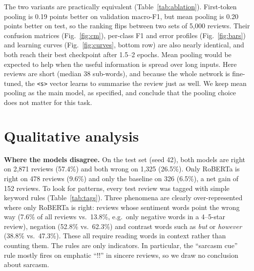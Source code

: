 \documentclass[11pt,a4paper]{article}
\begin{document}
The two variants are practically equivalent (Table~\ref{tab:ablation}). First-token pooling is 0.19 points better on validation macro-F1, but mean pooling is 0.20 points better on test, so the ranking flips between two sets of 5{,}000 reviews. Their confusion matrices (Fig.~\ref{fig:cm}), per-class F1 and error profiles (Fig.~\ref{fig:bars}) and learning curves (Fig.~\ref{fig:curves}, bottom row) are also nearly identical, and both reach their best checkpoint after 1.5--2 epochs. Mean pooling would be expected to help when the useful information is spread over long inputs. Here reviews are short (median 38 sub-words), and because the whole network is fine-tuned, the \texttt{<s>} vector learns to summarise the review just as well. We keep mean pooling as the main model, as specified, and conclude that the pooling choice does not matter for this task.

\section{Qualitative analysis}
\textbf{Where the models disagree.} On the test set (seed 42), both models are right on 2{,}871 reviews (57.4\%) and both wrong on 1{,}325 (26.5\%). Only RoBERTa is right on 478 reviews (9.6\%) and only the baseline on 326 (6.5\%), a net gain of 152 reviews. To look for patterns, every test review was tagged with simple keyword rules (Table~\ref{tab:tags}). Three phenomena are clearly over-represented where only RoBERTa is right: reviews whose sentiment words point the wrong way (7.6\% of all reviews vs.\ 13.8\%, e.g.\ only negative words in a 4--5-star review), negation (52.8\% vs.\ 62.3\%) and contrast words such as \textit{but} or \textit{however} (38.8\% vs.\ 47.3\%). These all require reading words in context rather than counting them. The rules are only indicators. In particular, the ``sarcasm cue'' rule mostly fires on emphatic ``!!'' in sincere reviews, so we draw no conclusion about sarcasm.
\end{document}
